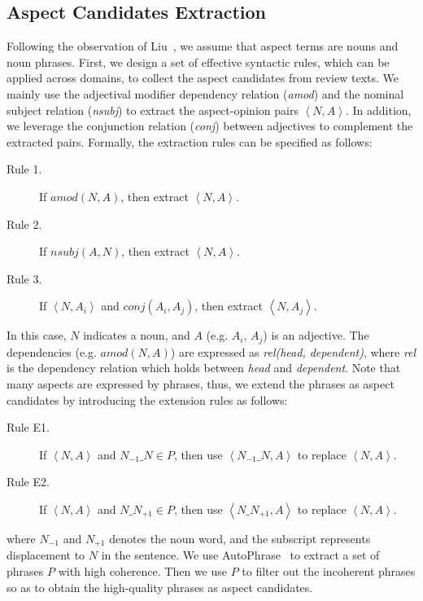 \documentclass[11pt,a4paper]{article}
\begin{document}
\subsection{Aspect Candidates Extraction}
\label{sec:candidate}
Following the observation of Liu~, 
we assume that aspect terms are nouns and noun phrases.  
First, we design a set of effective syntactic rules, which can be applied across domains, to collect the aspect candidates from review texts.
We mainly use the adjectival modifier dependency relation (\emph{amod})
and the nominal subject relation (\emph{nsubj})
to extract the aspect-opinion pairs $\left\langle N, A \right\rangle$.
In addition, we leverage the conjunction relation (\emph{conj}) between 
adjectives to complement the extracted pairs. 
Formally, the extraction rules can be specified as follows:
\begin{description}
	\item[Rule 1.] If $amod(N, A)$, then extract $\left\langle N, A \right\rangle$.
	\item[Rule 2.] If $nsubj(A, N)$, then extract $\left\langle N, A \right\rangle$.
	\item[Rule 3.] If $\left\langle N, A_i \right\rangle$ and $conj(A_i, A_j)$, then extract $\left\langle N, A_j \right\rangle$.
\end{description}
In this case, $N$ indicates a noun, and $A$ (e.g. $A_i$, $A_j$) is an adjective. The dependencies (e.g. $amod(N, A)$) are expressed as \emph{rel(head, dependent)}, where \emph{rel} is the dependency relation which holds between \emph{head} and \emph{dependent}.
Note that many aspects are expressed by phrases, thus,
we extend the phrases as aspect candidates by introducing the extension rules as follows:
\begin{description}
	\item[Rule E1.] If $\left\langle N, A \right\rangle$ and $N_{-1}\_N\in P$, then use $\left\langle N_{-1}\_N, A \right\rangle$ to replace $\left\langle N, A \right\rangle$.
	\item[Rule E2.] If $\left\langle N, A \right\rangle$ and $N\_N_{+1}\in P$, then use $\left\langle N\_N_{+1}, A \right\rangle$ to replace $\left\langle N, A \right\rangle$.
\end{description}
where $N_{-1}$ and $N_{+1}$ denotes the noun word,
and the subscript represents displacement to $N$ in the 
sentence. 
We use AutoPhrase~\cite{liu2017phrase} to extract a set of
phrases $P$ with high coherence.
Then we use $P$ to filter
out the incoherent phrases so as to obtain the high-quality phrases as aspect candidates.
\end{document}
